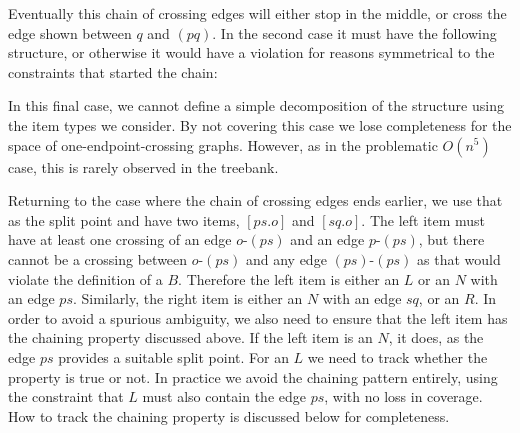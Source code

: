 Eventually this chain of crossing edges will either stop in the middle, or cross the edge shown between $q$ and $(pq)$.
In the second case it must have the following structure, or otherwise it would have a \oneEC violation for reasons symmetrical to the constraints that started the chain:

\begin{center}
\end{center}

In this final case, we cannot define a simple decomposition of the structure using the item types we consider.
By not covering this case we lose completeness for the space of one-endpoint-crossing graphs.
However, as in the problematic $O(n^5)$ case, this is rarely observed in the treebank.

Returning to the case where the chain of crossing edges ends earlier, we use that as the split point and have two items, $[ps.o]$ and $[sq.o]$.
The left item must have at least one crossing of an edge $o$-$(ps)$ and an edge $p$-$(ps)$, but there cannot be a crossing between $o$-$(ps)$ and any edge $(ps)$-$(ps)$ as that would violate the definition of a $B$.
Therefore the left item is either an $L$ or an $N$ with an edge $ps$.
Similarly, the right item is either an $N$ with an edge $sq$, or an $R$.
In order to avoid a spurious ambiguity, we also need to ensure that the left item has the chaining property discussed above.
If the left item is an $N$, it does, as the edge $ps$ provides a suitable split point.
For an $L$ we need to track whether the property is true or not.
In practice we avoid the chaining pattern entirely, using the constraint that $L$ must also contain the edge $ps$, with no loss in coverage.
How to track the chaining property is discussed below for completeness.

